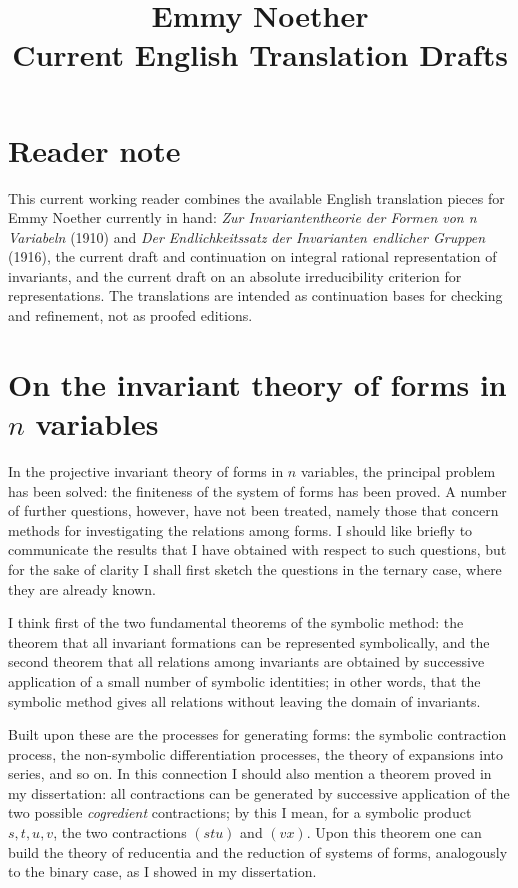 \documentclass[11pt]{article}
\title{Emmy Noether\\Current English Translation Drafts}
\author{}
\date{}
\begin{document}
\maketitle

\section*{Reader note}
This current working reader combines the available English translation pieces for Emmy Noether currently in hand:
\emph{Zur Invariantentheorie der Formen von n Variabeln} (1910) and
\emph{Der Endlichkeitssatz der Invarianten endlicher Gruppen} (1916), the current draft and continuation on integral rational representation of invariants, and the current draft on an absolute irreducibility criterion for representations.
The translations are intended as continuation bases for checking and refinement, not as proofed editions.

\section*{On the invariant theory of forms in $n$ variables}

In the projective invariant theory of forms in $n$ variables, the principal problem has been solved: the finiteness of the system of forms has been proved. A number of further questions, however, have not been treated, namely those that concern methods for investigating the relations among forms. I should like briefly to communicate the results that I have obtained with respect to such questions, but for the sake of clarity I shall first sketch the questions in the ternary case, where they are already known.

I think first of the two fundamental theorems of the symbolic method: the theorem that all invariant formations can be represented symbolically, and the second theorem that all relations among invariants are obtained by successive application of a small number of symbolic identities; in other words, that the symbolic method gives all relations without leaving the domain of invariants.

Built upon these are the processes for generating forms: the symbolic contraction process, the non-symbolic differentiation processes, the theory of expansions into series, and so on. In this connection I should also mention a theorem proved in my dissertation: all contractions can be generated by successive application of the two possible \emph{cogredient} contractions; by this I mean, for a symbolic product $s,t,u,v$, the two contractions $(stu)$ and $(vx)$. Upon this theorem one can build the theory of reducentia and the reduction of systems of forms, analogously to the binary case, as I showed in my dissertation.
\end{document}
